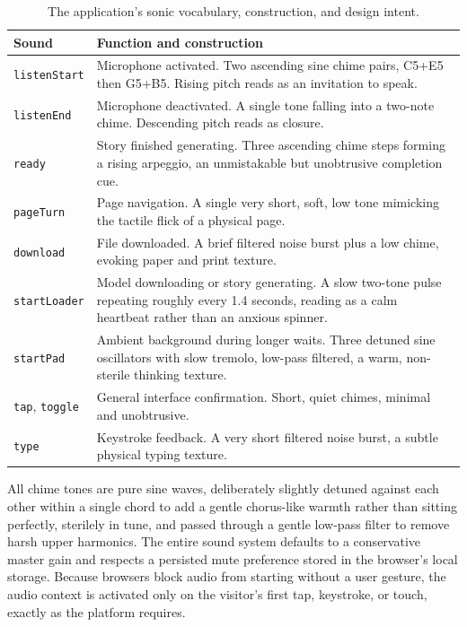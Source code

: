 \documentclass[conference]{IEEEtran}
\begin{document}
\begin{table}[t]
\caption{The application's sonic vocabulary, construction, and design intent.}
\label{tab:sound}
\centering
\begin{tabular}{p{1.4cm}p{2.6cm}}
\toprule
Sound & Function and construction \\
\midrule
\texttt{listenStart} & Microphone activated. Two ascending sine chime pairs, C5+E5 then G5+B5. Rising pitch reads as an invitation to speak. \\
\texttt{listenEnd} & Microphone deactivated. A single tone falling into a two-note chime. Descending pitch reads as closure. \\
\texttt{ready} & Story finished generating. Three ascending chime steps forming a rising arpeggio, an unmistakable but unobtrusive completion cue. \\
\texttt{pageTurn} & Page navigation. A single very short, soft, low tone mimicking the tactile flick of a physical page. \\
\texttt{download} & File downloaded. A brief filtered noise burst plus a low chime, evoking paper and print texture. \\
\texttt{startLoader} & Model downloading or story generating. A slow two-tone pulse repeating roughly every 1.4 seconds, reading as a calm heartbeat rather than an anxious spinner. \\
\texttt{startPad} & Ambient background during longer waits. Three detuned sine oscillators with slow tremolo, low-pass filtered, a warm, non-sterile thinking texture. \\
\texttt{tap}, \texttt{toggle} & General interface confirmation. Short, quiet chimes, minimal and unobtrusive. \\
\texttt{type} & Keystroke feedback. A very short filtered noise burst, a subtle physical typing texture. \\
\bottomrule
\end{tabular}
\end{table}

All chime tones are pure sine waves, deliberately slightly detuned against each other within a single chord to add a gentle chorus-like warmth rather than sitting perfectly, sterilely in tune, and passed through a gentle low-pass filter to remove harsh upper harmonics. The entire sound system defaults to a conservative master gain and respects a persisted mute preference stored in the browser's local storage. Because browsers block audio from starting without a user gesture, the audio context is activated only on the visitor's first tap, keystroke, or touch, exactly as the platform requires.
\end{document}
